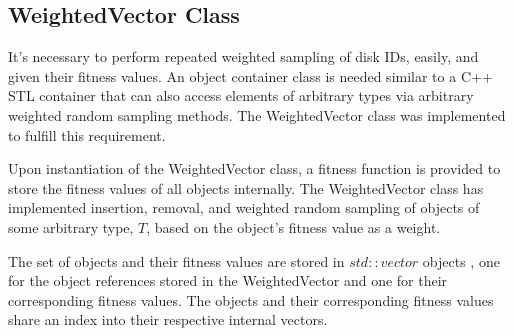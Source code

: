 \documentclass[12pt]{article}
\begin{document}
  \subsection{WeightedVector Class}

  It's necessary to perform repeated weighted sampling of disk IDs, easily, and
  given their fitness values. An object container class is needed similar to a
  C++ STL container \cite{stl} that can also access elements of arbitrary
  types via arbitrary weighted random sampling methods. The WeightedVector
  class was implemented to fulfill this requirement. 

  Upon instantiation of the WeightedVector class, a fitness function is
  provided to store the fitness values of all objects internally. The
  WeightedVector class has implemented insertion, removal, and weighted random
  sampling of objects of some arbitrary type, $T$, based on the object's
  fitness value as a weight.

  The set of objects and their fitness values are stored in $std::vector$
  objects , one for the object references stored in the WeightedVector and one
  for their corresponding fitness values. The objects and their corresponding
  fitness values share an index into their respective internal vectors.
\end{document}
